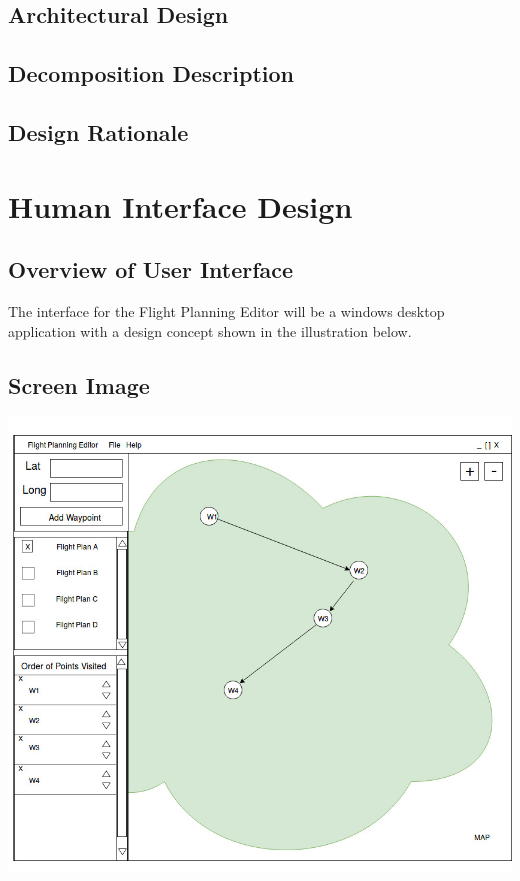 \documentclass[12pt, letterpaper]{article}
\begin{document}
  \subsection{Architectural Design}
  \subsection{Decomposition Description}
  \subsection{Design Rationale}

\newpage

\section{Human Interface Design}

\subsection{Overview of User Interface}
The interface for the Flight Planning Editor will be a windows desktop application with a design concept shown in the illustration below. 
	\subsection{Screen Image}
\includegraphics[width=\linewidth]{FlightPlanning_Interface}
\end{document}
